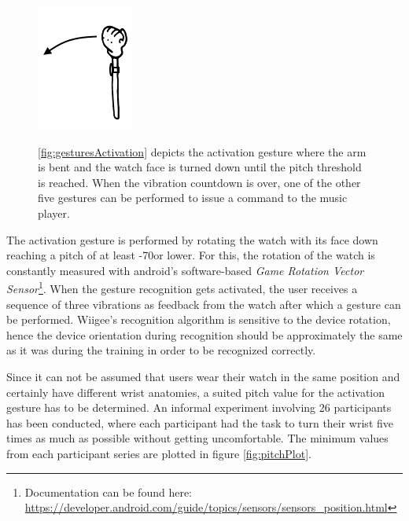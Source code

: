 \begin{figure}[h]
	{\label{fig:gesturesPrevious}
	\includegraphics[width=.25\linewidth]{img/previous.png}} \quad
	\caption{\ref{fig:gesturesActivation} depicts the activation gesture where the arm is bent and the watch face is turned down until the pitch threshold is reached. When the vibration countdown is over, one of the other five gestures can be performed to issue a command to the music player.}
	\label{fig:gestures}
\end{figure}

The activation gesture is performed by rotating the watch with its face down reaching a pitch of at least -70\textdegree or lower. For this, the rotation of the watch is constantly measured with android's software-based \textit{Game Rotation Vector Sensor}\footnote{Documentation can be found here: \url{https://developer.android.com/guide/topics/sensors/sensors_position.html}}. When the gesture recognition gets activated, the user receives a sequence of three vibrations as feedback from the watch after which a gesture can be performed. Wiigee's recognition algorithm is sensitive to the device rotation, hence the device orientation during recognition should be approximately the same as it was during the training in order to be recognized correctly.

Since it can not be assumed that users wear their watch in the same position and certainly have different wrist anatomies, a suited pitch value for the activation gesture has to be determined. An informal experiment involving 26 participants has been conducted, where each participant had the task to turn their wrist five times as much as possible without getting uncomfortable. The minimum values from each participant series are plotted in figure \ref{fig:pitchPlot}.

